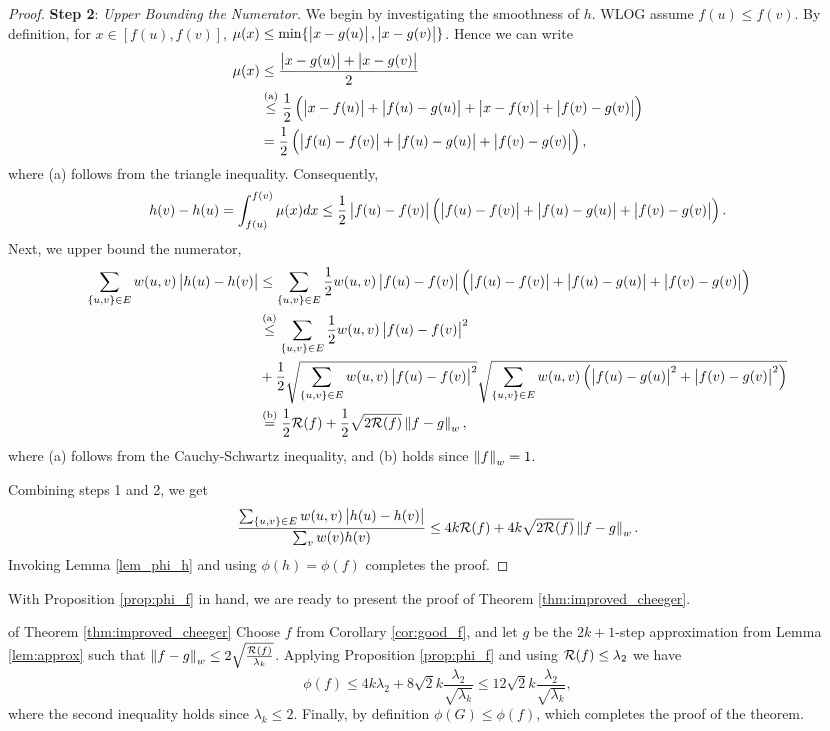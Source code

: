 \documentclass[11pt]{article}
\begin{document}
\begin{proof}
    \textbf{Step 2}: \textit{Upper Bounding the Numerator.} We begin by investigating the smoothness of $h$. WLOG assume $f(u) \leq f(v)$. By definition, for $x \in [f(u),f(v)]$, $\mu(x) \leq \min\{\left| x-g(u) \right|,\left| x-g(v) \right|\}$. Hence we can write
    \begin{align*}
        \mu(x) &\leq \frac{\left| x-g(u) \right| + \left| x-g(v) \right|}{2}\\
        &\stackrel{\text{(a)}}{\leq} \frac{1}{2}\left(\left| x - f(u) \right| + \left| f(u) - g(u) \right| + \left| x-f(v) \right| + \left| f(v) - g(v) \right|\right)\\
        &= \frac{1}{2}\left(\left| f(u) - f(v) \right| + \left| f(u) - g(u) \right| + \left| f(v) - g(v) \right|\right),
    \end{align*}
    where (a) follows from the triangle inequality. Consequently,
    $$h(v) - h(u) = \int_{f(u)}^{f(v)}\mu(x)dx \leq \frac{1}{2}\left| f(u) - f(v) \right|\left(\left| f(u) - f(v) \right| + \left| f(u) - g(u) \right| + \left| f(v) - g(v) \right|\right).$$
    Next, we upper bound the numerator,
    \begin{align*}
        \sum_{\{u,v\} \in E}w(u,v)\left| h(u) - h(v) \right| &\leq \sum_{\{u,v\} \in E}\frac{1}{2}w(u,v)\left| f(u) - f(v) \right|\left(\left| f(u) - f(v) \right| + \left| f(u) - g(u) \right| + \left| f(v) - g(v) \right|\right)\\
        &\stackrel{\text{(a)}}{\leq} \sum_{\{u,v\} \in E}\frac{1}{2}w(u,v)\left| f(u) - f(v) \right|^2 \\
        &+ \frac{1}{2}\sqrt{\sum_{\{u,v\} \in E}w(u,v)\left| f(u) - f(v) \right|^2}\sqrt{\sum_{\{u,v\} \in E}w(u,v)\left(\left| f(u) - g(u) \right|^2 + \left| f(v) - g(v) \right|^2\right)}\\
        &\stackrel{\text{(b)}}{=} \frac{1}{2}\mathcal{R}(f) + \frac{1}{2}\sqrt{2\mathcal{R}(f)}\left\lVert f-g \right\rVert_w,
    \end{align*}
    where (a) follows from the Cauchy-Schwartz inequality, and (b) holds since $\left\lVert f \right\rVert_w = 1$.

    Combining steps 1 and 2, we get
    \begin{equation}
        \frac{\sum_{\{u,v\} \in E}w(u,v)\left| h(u) - h(v) \right|}{\sum_v w(v)h(v)} \leq 4k\mathcal{R}(f) + 4k\sqrt{2\mathcal{R}(f)}\left\lVert f-g \right\rVert_w.
    \end{equation}
    Invoking Lemma \ref{lem_phi_h} and using $\phi(h) = \phi(f)$ completes the proof.
\end{proof}

With Proposition \ref{prop:phi_f} in hand, we are ready to present the proof of Theorem \ref{thm:improved_cheeger}.

\begin{proofof}{of Theorem \ref{thm:improved_cheeger}}
    Choose $f$ from Corollary \ref{cor:good_f}, and let $g$ be the $2k+1$-step approximation from Lemma \ref{lem:approx} such that $\left\lVert f-g \right\rVert_w \leq 2\sqrt{\tfrac{\mathcal{R}(f)}{\lambda_k}}$. Applying Proposition \ref{prop:phi_f} and using $\mathcal{R}(f) \leq \lambda_2$ we have
    $$\phi(f) \leq 4k\lambda_2 + 8\sqrt{2}k\frac{\lambda_2}{\sqrt{\lambda_k}} \leq 12\sqrt{2}k\frac{\lambda_2}{\sqrt{\lambda_k}},$$
    where the second inequality holds since $\lambda_k \leq 2$. Finally, by definition $\phi(G) \leq \phi(f)$, which completes the proof of the theorem.
\end{proofof}
\end{document}
